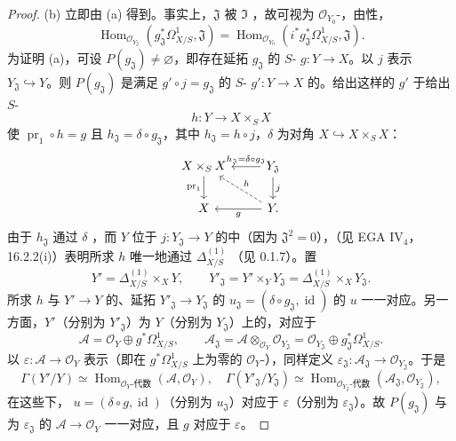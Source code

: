 \begin{proof}
(b) 立即由 (a) 得到。事实上，$\mathfrak J$ 被 $\mathfrak I$ ，故可视为 $\mathcal O_{Y_0}$-，由性，
\[\operatorname{Hom}_{\mathcal O_{Y_{\mathfrak J}}}(g_{\mathfrak J}^*\Omega^1_{X/S},\mathfrak J)=\operatorname{Hom}_{\mathcal O_{Y_0}}(i^*g_{\mathfrak J}^*\Omega^1_{X/S},\mathfrak J).\]
为证明 (a)，可设 $P(g_{\mathfrak J})\neq\varnothing$，即存在延拓 $g_{\mathfrak J}$ 的 $S$- $g:Y\to X$。以 $j$ 表示 $Y_{\mathfrak J}\hookrightarrow Y$。则 $P(g_{\mathfrak J})$ 是满足 $g'\circ j=g_{\mathfrak J}$ 的 $S$- $g':Y\to X$ 的。给出这样的 $g'$ 于给出 $S$-
\[h:Y\longrightarrow X\times_S X\]
使 $\operatorname{pr}_1\circ h=g$ 且 $h_{\mathfrak J}=\delta\circ g_{\mathfrak J}$，其中 $h_{\mathfrak J}=h\circ j$，$\delta$ 为对角 $X\hookrightarrow X\times_S X$：
\[\begin{tikzcd}
X\times_S X\arrow[d,"\operatorname{pr}_1"']&Y_{\mathfrak J}\arrow[l,"h_{\mathfrak J}=\delta\circ g_{\mathfrak J}"']\arrow[d,"j"]\\X&Y\arrow[l,"g"]\arrow[ul,dashed,"h"'].
\end{tikzcd}\]
由于 $h_{\mathfrak J}$ 通过 $\delta$ ，而 $Y$ 位于 $j:Y_{\mathfrak J}\to Y$ 的中（因为 $\mathfrak J^2=0$），（见 EGA IV$_4$，16.2.2(i)）表明所求 $h$ 唯一地通过 $\Delta^{(1)}_{X/S}$ （见 0.1.7）。置
\[Y'=\Delta^{(1)}_{X/S}\times_X Y,\qquad Y'_{\mathfrak J}=Y'\times_Y Y_{\mathfrak J}=\Delta^{(1)}_{X/S}\times_X Y_{\mathfrak J}.\]
所求 $h$ 与 $Y'\to Y$ 的、延拓 $Y'_{\mathfrak J}\to Y_{\mathfrak J}$ 的 $u_{\mathfrak J}=(\delta\circ g_{\mathfrak J},\operatorname{id})$ 的 $u$ 一一对应。另一方面，$Y'$（分别为 $Y'_{\mathfrak J}$）为 $Y$（分别为 $Y_{\mathfrak J}$）上的，对应于
\[\mathcal A=\mathcal O_Y\oplus g^*\Omega^1_{X/S},\qquad\mathcal A_{\mathfrak J}=\mathcal A\otimes_{\mathcal O_Y}\mathcal O_{Y_{\mathfrak J}}=\mathcal O_{Y_{\mathfrak J}}\oplus g_{\mathfrak J}^*\Omega^1_{X/S}.\]
以 $\varepsilon:\mathcal A\to\mathcal O_Y$ 表示（即在 $g^*\Omega^1_{X/S}$ 上为零的 $\mathcal O_Y$-），同样定义 $\varepsilon_{\mathfrak J}:\mathcal A_{\mathfrak J}\to\mathcal O_{Y_{\mathfrak J}}$。于是
\[\Gamma(Y'/Y)\simeq\operatorname{Hom}_{\mathcal O_Y\text{-代数}}(\mathcal A,\mathcal O_Y),\quad\Gamma(Y'_{\mathfrak J}/Y_{\mathfrak J})\simeq\operatorname{Hom}_{\mathcal O_{Y_{\mathfrak J}}\text{-代数}}(\mathcal A_{\mathfrak J},\mathcal O_{Y_{\mathfrak J}}),\]
在这些下， $u=(\delta\circ g,\operatorname{id})$（分别为 $u_{\mathfrak J}$）对应于 $\varepsilon$（分别为 $\varepsilon_{\mathfrak J}$）。故 $P(g_{\mathfrak J})$ 与为 $\varepsilon_{\mathfrak J}$ 的 $\mathcal A\to\mathcal O_Y$ 一一对应，且 $g$ 对应于 $\varepsilon$。


\end{proof}
